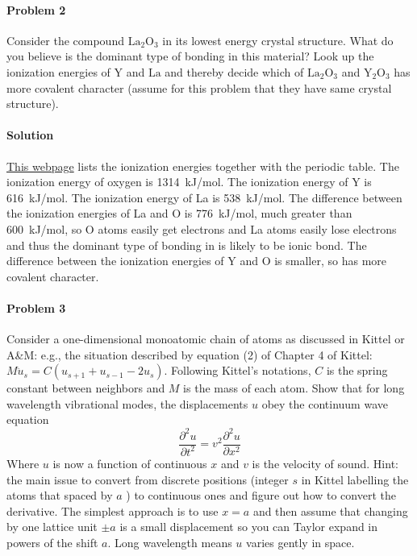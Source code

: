 \documentclass[hyperref, a4paper]{article}
\begin{document}
\paragraph{Problem 2} Consider the compound $\mathrm{La}_2 \mathrm{O}_3$ in its lowest energy crystal structure. What do you believe is the dominant type of bonding in this material? Look up the ionization energies of $\mathrm{Y}$ and $\mathrm{La}$ and thereby decide which of $\mathrm{La}_2 \mathrm{O}_3$ and $\mathrm{Y}_2 \mathrm{O}_3$ has more covalent character (assume for this problem that they have same crystal structure).

\paragraph{Solution} 
\href{https://www.angelo.edu/faculty/kboudrea/periodic/trends\_ionization\_energy.htm}{This webpage}
lists the ionization energies together with the periodic table.
The ionization energy of oxygen is \SI{1314}{kJ/mol}.
The ionization energy of Y is \SI{616}{kJ/mol}.
The ionization energy of La is \SI{538}{kJ/mol}.
The difference between the ionization energies of La and O is \SI{776}{kJ/mol},
much greater than \SI{600}{kJ/mol},
so O atoms easily get electrons and La atoms easily lose electrons
and thus the dominant type of bonding in  is likely to be ionic bond.
The difference between the ionization energies of Y and O is smaller,
so  has more covalent character.

\paragraph{Problem 3} Consider a one-dimensional monoatomic chain of atoms as discussed in Kittel or A\&M: e.g., the situation described by equation (2) of Chapter 4 of Kittel: $M \ddot{u}_s=C\left(u_{s+1}+u_{s-1}-2 u_s\right)$. Following Kittel's notations, $C$ is the spring constant between neighbors and $M$ is the mass of each atom. Show that for long wavelength vibrational modes, the displacements $u$ obey the continuum wave equation
$$
\frac{\partial^2 u}{\partial t^2}=v^2 \frac{\partial^2 u}{\partial x^2}
$$
Where $u$ is now a function of continuous $x$ and $v$ is the velocity of sound. Hint: the main issue to convert from discrete positions (integer $s$ in Kittel labelling the atoms that spaced by $a$ ) to continuous ones and figure out how to convert the derivative. The simplest approach is to use $x=a$ and then assume that changing by one lattice unit $\pm a$ is a small displacement so you can Taylor expand in powers of the shift $a$. Long wavelength means $u$ varies gently in space.
\end{document}
